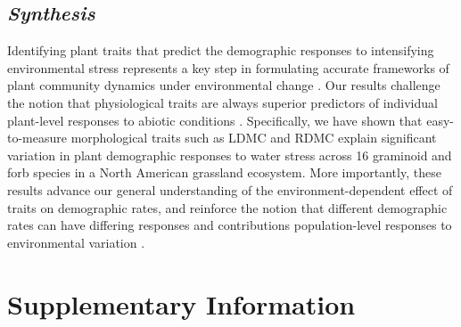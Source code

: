 \documentclass[12pt, letterpaper]{article}
\begin{document}
\subsection{\textit{Synthesis}} Identifying plant traits that predict the demographic responses to intensifying environmental stress represents a key step in formulating accurate frameworks of plant community dynamics under environmental change \cite{Laughlin2020TheFitness}. Our results challenge the notion that physiological traits are always superior predictors of individual plant-level responses to abiotic conditions \cite{Volaire2018}. Specifically, we have shown that easy-to-measure morphological traits such as LDMC and RDMC explain significant variation in plant demographic responses to water stress across 16 graminoid and forb species in a North American grassland ecosystem. More importantly, these results advance our general understanding of the environment-dependent effect of traits on demographic rates, and reinforce the notion that different demographic rates can have differing responses and contributions population-level responses to environmental variation \cite{Laughlin2020TheFitness}. 



\renewcommand{\thetable}{S\arabic{table}} %
\setcounter{table}{0} %
\renewcommand{\thefigure}{S\arabic{figure}} %
\setcounter{figure}{0} %


\section{Supplementary Information}
\end{document}
